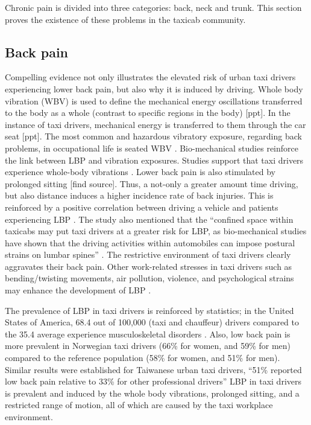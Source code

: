 \documentclass[11pt]{article}
\begin{document}
Chronic pain is divided into three categories: back, neck and trunk.
This section proves the existence of these problems in the taxicab community.

\subsection{Back pain}
Compelling evidence not only illustrates the elevated risk of urban
taxi drivers experiencing lower back pain, but also why it is induced
by driving. Whole body vibration (WBV) is used to define the
mechanical energy oscillations transferred to the body as a whole
(contrast to specific regions in the body) [ppt]. In the instance of
taxi drivers, mechanical energy is transferred to them through the car
seat [ppt]. The most common and hazardous vibratory exposure,
regarding back problems, in occupational life is seated WBV
\cite{ODrivers@Risk}. Bio-mechanical studies reinforce the link
between LBP and vibration exposures. Studies support that taxi drivers
experience whole-body vibrations \cite{KneePain, Serious}. Lower back
pain is also stimulated by prolonged sitting [find source]. Thus, a
not-only a greater amount time driving, but also distance induces a
higher incidence rate of back injuries\cite{Question?}. This is
reinforced by a positive correlation between driving a vehicle and
patients experiencing LBP \cite{ODrivers@Risk}. The study also
mentioned that the “confined space within taxicabs may put taxi
drivers at a greater risk for LBP, as bio-mechanical studies have
shown that the driving activities within automobiles can impose
postural strains on lumbar spines” \cite{KneePain}. The restrictive
environment of taxi drivers clearly aggravates their back pain. Other
work-related stresses in taxi drivers such as bending/twisting
movements, air pollution, violence, and psychological strains may
enhance the development of LBP \cite{KneePain, POSTULATED}. 

The prevalence of LBP in taxi drivers is reinforced by statistics; in the
United States of America, 68.4 out of 100,000 (taxi and chauffeur)
drivers compared to the 35.4 average experience musculoskeletal
disorders \cite{68}. Also, low back pain is more prevalent in
Norwegian taxi drivers (66\% for women, and 59\% for men) compared to
the reference population (58\% for women, and 51\% for men). Similar
results were established for Taiwanese urban taxi drivers, “51\%
reported low back pain relative to 33\% for other professional
drivers” \cite{Question?} LBP in taxi drivers is prevalent and induced
by the whole body vibrations, prolonged sitting, and a restricted
range of motion, all of which are caused by the taxi workplace
environment.
 
\end{document}
